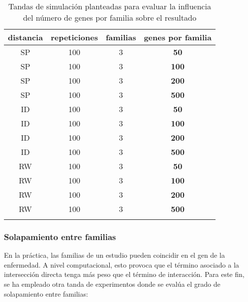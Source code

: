 \bigskip
\begin{small}
\begin{center}
\begin{table}[H]
\begin{tabular}{cccc}
\textbf{distancia} & \textbf{repeticiones} & \textbf{familias} & \textbf{genes por familia}\tabularnewline 
\hline
\hline
\addlinespace[0.2cm]
SP	 & 100 & 3 & \textbf{50} \tabularnewline
SP	 & 100 & 3 & \textbf{100} \tabularnewline
SP	 & 100 & 3 & \textbf{200} \tabularnewline
SP	 & 100 & 3 & \textbf{500} \tabularnewline
\addlinespace[0.2cm]
\hline
\addlinespace[0.2cm]
ID	 & 100 & 3 & \textbf{50} \tabularnewline
ID	 & 100 & 3 & \textbf{100} \tabularnewline
ID	 & 100 & 3 & \textbf{200} \tabularnewline
ID	 & 100 & 3 & \textbf{500} \tabularnewline
\addlinespace[0.2cm]
\hline
\addlinespace[0.2cm]
RW  & 100 & 3 & \textbf{50} \tabularnewline
RW	 & 100 & 3 & \textbf{100} \tabularnewline
RW	 & 100 & 3 & \textbf{200} \tabularnewline
RW	 & 100 & 3 & \textbf{500} \tabularnewline
\addlinespace[0.2cm]
\hline
\end{tabular}
\caption{Tandas de simulación planteadas para evaluar la influencia del número de genes por familia sobre el resultado}
\label{tab:tabla_genes}
\end{table}
\end{center}
\end{small}
\bigskip

\subsubsection{Solapamiento entre familias}
En la práctica, las familias de un estudio pueden coincidir en el gen de la enfermedad. A nivel computacional, esto provoca que el término asociado a la intersección directa tenga más peso que el término de interacción. Para este fin, se ha empleado otra tanda de experimentos donde se evalúa el grado de solapamiento entre familias:

